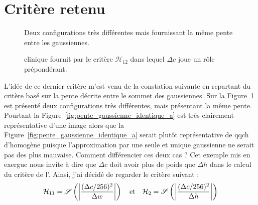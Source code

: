 \documentclass[main.tex]{subfiles}
\begin{document}
\section{Critère retenu}
\begin{figure}
\centering
{}
\caption{\label{fig:pente_gaussienne_identique}Deux configurations très différentes mais fournissant la même pente entre les gaussiennes.}
\end{figure}
%
\begin{figure}
\centering
{}
\caption{\label{fig:critere_dc2_sur_dh}\Hetero clinique fournit par le critère $\mathcal{H}_{12}$ dans lequel $\Delta c$ joue un rôle prépondérant.}
\end{figure}
L'idée de ce dernier critère m'est venu de la constation suivante en repartant du critère basé sur la pente décrite entre le sommet des gaussiennes. Sur la Figure~\ref{fig:pente_gaussienne_identique} est présenté deux configurations très différentes, mais présentant la même pente. Pourtant la Figure~\ref{fig:pente_gaussienne_identique_a} est très clairement représentative d'une image \heterogene alors que la Figure~\ref{fig:pente_gaussienne_identique_a} serait plutôt représentative de qqch d'homogène puisque l'approximation par une seule et unique gaussienne ne serait pas des plus mauvaise. 
Comment différencier ces deux cas ? Cet exemple mis en exergue nous invite à dire que $\Delta c$ doit avoir plus de poids que $\Delta h$ dans le calcul du critère de l'\hetero. Ainsi, j'ai décidé de regarder le critère suivant :
\begin{equation}
\label{eq:criteres_finaux}
\mathcal{H}_{11} = \mathscr{S}\left( \left| \dfrac{(\Delta c /256)^2}{\Delta w} \right| \right)
\quad {\rm et } \quad
\mathcal{H}_{2} = \mathscr{S} \left( \left| \dfrac{(\Delta c /256)^2}{\Delta h} \right| \right)
\end{equation}
\end{document}
